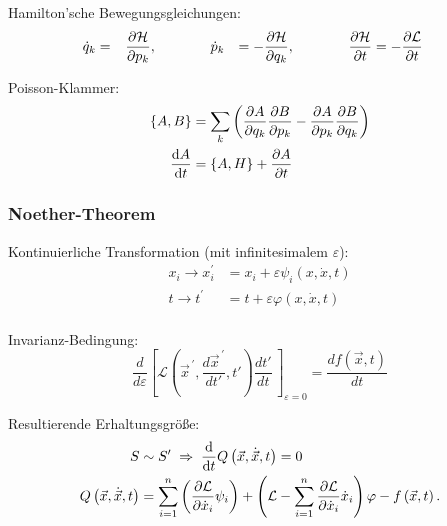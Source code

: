 \documentclass[11pt]{article}
\numberwithin{equation}{section}
\begin{document}
				\noindent
				Hamilton'sche Bewegungsgleichungen:
				\begin{equation}
					\begin{aligned}
						\dot{q}_k &= \phantom{-}\frac{\partial \mathcal{H}}{\partial p_k}, &&\hspace{30pt}
						\dot{p}_k &= -\frac{\partial \mathcal{H}}{\partial q_k}, &&\hspace{30pt}
						\frac{\partial \mathcal{H}}{\partial t} &= -\frac{\partial \mathcal{L}}{\partial t}
					\end{aligned}
				\end{equation}

				\noindent
				Poisson-Klammer:
				\begin{equation}
					\begin{aligned}
						\lbrace A, B \rbrace &= \sum_k \left(
							\frac{\partial A}{\partial q_k}\frac{\partial B}{\partial p_k} - \frac{\partial A}{\partial p_k}\frac{\partial B}{\partial q_k}
						\right) \\
						\frac{\mathrm{d} A}{\mathrm{d} t} &= \left\lbrace A, H \right\rbrace + \frac{\partial A}{\partial t}
					\end{aligned}
				\end{equation}

			\subsubsection{Noether-Theorem}
				\noindent
				Kontinuierliche Transformation (mit infinitesimalem $\varepsilon$):
				\begin{equation}
					\begin{aligned}
					x_i \rightarrow x_{i}^{\prime} &= x_i+\varepsilon\psi_i\left(x,\dot{x},t\right) \\
						t\rightarrow t^{\prime}\, &= t+\varepsilon\varphi\left(x,\dot{x},t\right) \\
					\end{aligned}
				\end{equation}

				\noindent
				Invarianz-Bedingung:
				\begin{equation}
					\frac{d}{d\varepsilon}\left[\mathcal{L}\left( {\vec{x}}^{\,\prime},\frac{d {\vec{x}}^{\,\prime}}{dt'},t'\right) \frac{dt'}{dt}\,\right]_{\varepsilon=0}=\frac{df(\vec{x}, t)}{dt}
				\end{equation}

				\noindent
				Resultierende Erhaltungsgröße:
				\begin{equation}
					\begin{aligned}
						S &\sim S' \;\Rightarrow\;
						\frac{\mathrm{d} }{\mathrm{d} t} Q\left(\vec{x},\dot{\vec{x}},t\right) = 0 \\
						Q\left(\vec{x},\dot{\vec{x}},t\right) &= \sum_{i=1}^{n}\left(\frac{\partial\mathcal{L}}{\partial{\dot{x}}_i}\psi_i\right)+\left(\mathcal{L}-\sum_{i=1}^{n}{\frac{\partial\mathcal{L}}{\partial{\dot{x}}_i}{\dot{x}}_i}\right)\varphi - f\left(\vec{x},t\right).
					\end{aligned}
				\end{equation}
\end{document}
